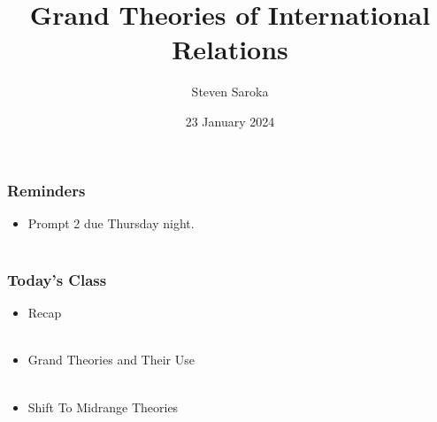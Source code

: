 \documentclass[handout]{beamer}
\title[Grand Theories]{\LARGE{Grand Theories of International Relations}}
\author[POLI 150]{Steven Saroka}
\institute{POLI 150}
\date{23 January 2024}
\begin{document}
\begin{frame}
\titlepage %
\end{frame}










\begin{frame} 
	\frametitle{\LARGE{Reminders}}
	\begin{itemize}
		\item Prompt 2 due Thursday night. 
		\\~\\ 
	\end{itemize}
\end{frame}

\begin{frame} 
	\frametitle{\LARGE{Today's Class}}
	\begin{itemize}
		\item Recap
		\\~\\ 
		\item Grand Theories and Their Use
		\\~\\ 
		\item Shift To Midrange Theories
		\\~\\ 
	\end{itemize}
\end{frame}
\end{document}
